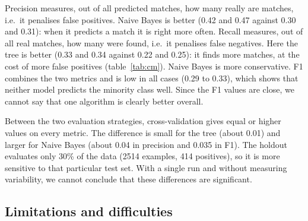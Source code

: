 \documentclass[12pt,a4paper]{article}
\begin{document}
Precision measures, out of all predicted matches, how many really are matches, i.e.\ it penalises false positives. Naive Bayes is better (0.42 and 0.47 against 0.30 and 0.31): when it predicts a match it is right more often. Recall measures, out of all real matches, how many were found, i.e.\ it penalises false negatives. Here the tree is better (0.33 and 0.34 against 0.22 and 0.25): it finds more matches, at the cost of more false positives (table~\ref{tab:cm}). Naive Bayes is more conservative. F1 combines the two metrics and is low in all cases (0.29 to 0.33), which shows that neither model predicts the minority class well. Since the F1 values are close, we cannot say that one algorithm is clearly better overall.

Between the two evaluation strategies, cross-validation gives equal or higher values on every metric. The difference is small for the tree (about 0.01) and larger for Naive Bayes (about 0.04 in precision and 0.035 in F1). The holdout evaluates only 30\% of the data (2514 examples, 414 positives), so it is more sensitive to that particular test set. With a single run and without measuring variability, we cannot conclude that these differences are significant.

\subsection{Limitations and difficulties}
\label{sec:limitacoes}
\end{document}

